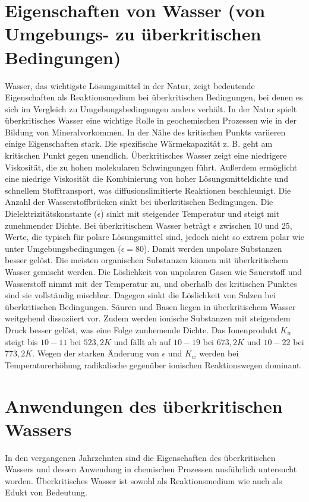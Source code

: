 \section{Eigenschaften von Wasser (von Umgebungs- zu überkritischen Bedingungen)}
Wasser, das wichtigste Lösungsmittel in der Natur, zeigt bedeutende Eigenschaften als Reaktionsmedium bei überkritischen Bedingungen, bei denen es sich im Vergleich zu Umgebungsbedingungen anders verhält. In der Natur spielt überkritisches Wasser eine wichtige Rolle in geochemischen Prozessen wie in der Bildung von Mineralvorkommen. 
In der Nähe des kritischen Punkts variieren einige Eigenschaften stark. Die spezifische Wärmekapazität z. B. geht am kritischen Punkt gegen unendlich.  Überkritisches Wasser zeigt eine niedrigere Viskosität, die zu hohen molekularen Schwingungen führt.  Außerdem ermöglicht eine niedrige Viskosität die Kombinierung von hoher Lösungsmitteldichte und schnellem Stofftransport, was diffusionslimitierte Reaktionen beschleunigt. Die Anzahl der Wasserstoffbrücken sinkt bei überkritischen Bedingungen.
Die Dielektrizitätskonstante ($\epsilon$) sinkt mit steigender Temperatur und steigt mit zunehmender Dichte. Bei überkritischem Wasser beträgt $\epsilon$ zwischen 10 und 25, Werte, die typisch für polare Lösungsmittel sind, jedoch nicht so extrem polar wie unter Umgebungsbedingungen ($\epsilon=80$). Damit werden unpolare Substanzen besser gelöst. Die meisten organischen Substanzen können mit überkritischem Wasser gemischt werden.  Die Löslichkeit von unpolaren Gasen wie Sauerstoff und Wasserstoff nimmt mit der Temperatur zu, und oberhalb des kritischen Punktes sind sie vollständig mischbar. Dagegen sinkt die Löslichkeit von Salzen bei überkritischen Bedingungen. Säuren und Basen liegen in überkritischem Wasser weitgehend dissoziiert vor. Zudem werden ionische Substanzen mit steigendem Druck  besser gelöst, was eine Folge zunhemende Dichte.
Das Ionenprodukt $K_w$ steigt bis $10-11$ bei $523,2 K$ und fällt ab auf $10-19$ bei $673,2 K$ und $10-22$ bei $773,2 K$. Wegen der starken Änderung von $\epsilon$ und $K_w$ werden bei Temperaturerhöhung radikalische gegenüber ionischen Reaktionswegen dominant.
\section{Anwendungen des überkritischen Wassers}
In den vergangenen Jahrzehnten sind die Eigenschaften des überkritischen Wassers und dessen Anwendung in chemischen Prozessen  ausführlich untersucht worden. Überkritisches Wasser ist sowohl als Reaktionsmedium wie auch als Edukt von Bedeutung.  
